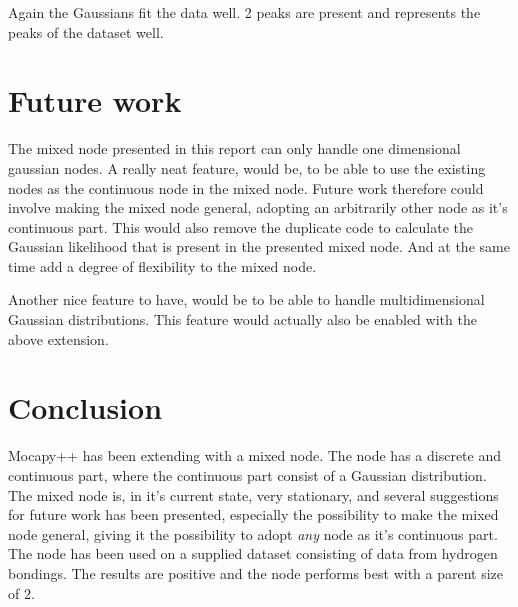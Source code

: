\documentclass[10pt, journal, compsoc, a4paper]{IEEEtran}
\begin{document}
Again the Gaussians fit the data well. 2 peaks are present and represents the peaks of the dataset well.




\section{Future work} %
\label{sec:future_work}
The mixed node presented in this report can only handle one dimensional gaussian nodes. A really neat feature, would be, to be able to use the existing nodes as the continuous node in the mixed node. Future work therefore could involve making the mixed node general, adopting an arbitrarily other node as it's continuous part. This would also remove the duplicate code to calculate the Gaussian likelihood that is present in the presented mixed node. And at the same time add a degree of flexibility to the mixed node.

Another nice feature to have, would be to be able to handle multidimensional Gaussian distributions. This feature would actually also be enabled with the above extension.


\section{Conclusion} %
\label{sec:conclusion}
Mocapy++ has been extending with a mixed node. The node has a discrete and continuous part, where the continuous part consist of a Gaussian distribution. The mixed node is, in it's current state, very stationary, and several suggestions for future work has been presented, especially the possibility to make the mixed node general, giving it the possibility to adopt \emph{any} node as it's continuous part. The node has been used on a supplied dataset consisting of data from hydrogen bondings. The results are positive and the node performs best with a parent size of $2$. 




\end{document}
